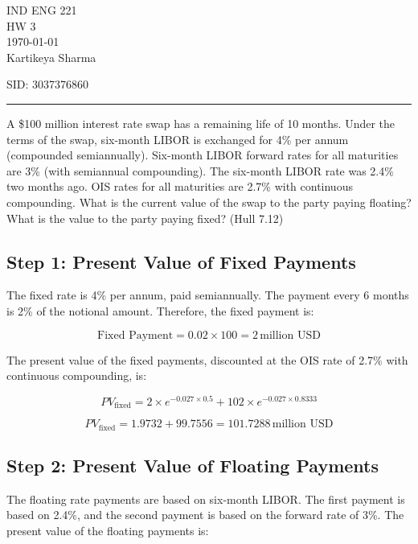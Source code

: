 \documentclass[12pt,letterpaper, onecolumn]{exam}
\begin{document}
\begingroup  
    \centering
    \LARGE IND ENG 221\\
    \LARGE HW 3\\[0.5em]
    \large \today\\[0.5em]
    \large Kartikeya Sharma\par
    \large SID: 3037376860\par
\endgroup
\rule{\textwidth}{0.4pt}
\pointsdroppedatright   %
\printanswers
\renewcommand{\solutiontitle}{\noindent\textbf{Ans:}\enspace}   %

\begin{questions}

    \question A \$100 million interest rate swap has a remaining life of 10 months. Under the terms
of the swap, six-month LIBOR is exchanged for 4\% per annum (compounded
semiannually). Six-month LIBOR forward rates for all maturities are 3\% (with
semiannual compounding). The six-month LIBOR rate was 2.4\% two months ago. OIS
rates for all maturities are 2.7\% with continuous compounding. What is the current value
of the swap to the party paying floating? What is the value to the party paying fixed?
(Hull 7.12)
    
    \begin{solution}

    \subsection*{Step 1: Present Value of Fixed Payments}
The fixed rate is 4\% per annum, paid semiannually. The payment every 6 months is 2\% of the notional amount. Therefore, the fixed payment is:

\[
\text{Fixed Payment} = 0.02 \times 100 = 2 \, \text{million USD}
\]

The present value of the fixed payments, discounted at the OIS rate of 2.7\% with continuous compounding, is:

\[
PV_{\text{fixed}} = 2 \times e^{-0.027 \times 0.5} + 102 \times e^{-0.027 \times 0.8333}
\]

\[
PV_{\text{fixed}} = 1.9732 + 99.7556 = 101.7288 \, \text{million USD}
\]

\subsection*{Step 2: Present Value of Floating Payments}
The floating rate payments are based on six-month LIBOR. The first payment is based on 2.4\%, and the second payment is based on the forward rate of 3\%. The present value of the floating payments is:


\end{solution}
\end{questions}
\end{document}
